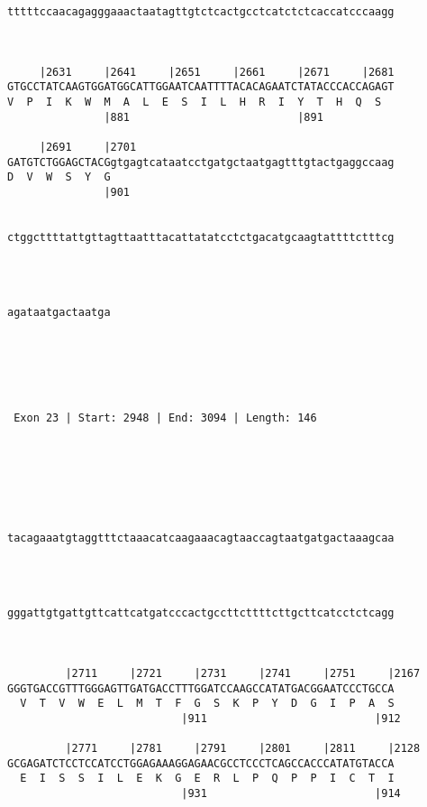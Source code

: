 \documentclass{article}
\begin{document}
\begin{Verbatim}
                                                            
   
                                                            
tttttccaacagagggaaactaatagttgtctcactgcctcatctctcaccatcccaagg
                                                            
                                                            
   
     |2631     |2641     |2651     |2661     |2671     |2681
GTGCCTATCAAGTGGATGGCATTGGAATCAATTTTACACAGAATCTATACCCACCAGAGT
V  P  I  K  W  M  A  L  E  S  I  L  H  R  I  Y  T  H  Q  S  
               |881                          |891           
   
     |2691     |2701                                        
GATGTCTGGAGCTACGgtgagtcataatcctgatgctaatgagtttgtactgaggccaag
D  V  W  S  Y  G                                            
               |901
   
                                                            
ctggcttttattgttagttaatttacattatatcctctgacatgcaagtattttctttcg
                                                            

   
                
agataatgactaatga
                

  



 Exon 23 | Start: 2948 | End: 3094 | Length: 146 





   
                                                            
tacagaaatgtaggtttctaaacatcaagaaacagtaaccagtaatgatgactaaagcaa
                                                            

   
                                                            
gggattgtgattgttcattcatgatcccactgccttcttttcttgcttcatcctctcagg
                                                            

   
         |2711     |2721     |2731     |2741     |2751     |2167
GGGTGACCGTTTGGGAGTTGATGACCTTTGGATCCAAGCCATATGACGGAATCCCTGCCA
  V  T  V  W  E  L  M  T  F  G  S  K  P  Y  D  G  I  P  A  S
                           |911                          |912
   
         |2771     |2781     |2791     |2801     |2811     |2128
GCGAGATCTCCTCCATCCTGGAGAAAGGAGAACGCCTCCCTCAGCCACCCATATGTACCA
  E  I  S  S  I  L  E  K  G  E  R  L  P  Q  P  P  I  C  T  I
                           |931                          |914
   

\end{Verbatim}
\end{document}
